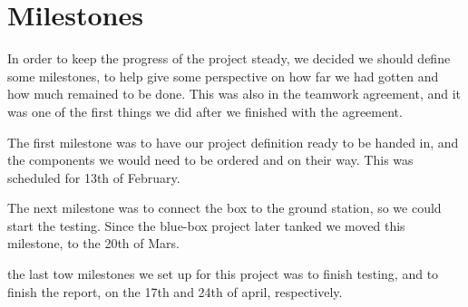 \section{Milestones}
In order to keep the progress of the project steady, we decided we should define some milestones, to help give some perspective on how far we had gotten and how much remained to be done. This was also in the teamwork agreement, and it was one of the first things we did after we finished with the agreement.

The first milestone was to have our project definition ready to be handed in, and the components we would need to be ordered and on their way. This was scheduled for 13th of February. 

The next milestone was to connect the box to the ground station, so we could start the testing. Since the blue-box project later tanked we moved this milestone, to the 20th of Mars.

the last tow milestones we set up for this project was to finish testing, and to finish the report, on the 17th and 24th of april, respectively.